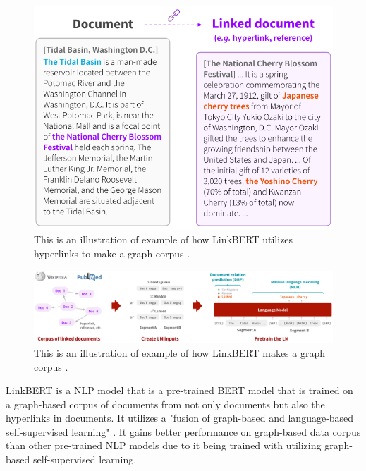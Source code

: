 \begin{figure}
    \includegraphics[width=1.0\columnwidth]{fig_motivation_v8.pdf}
    \caption{This is an illustration of example of how LinkBERT utilizes hyperlinks to make a graph corpus \cite{https://doi.org/10.48550/arxiv.2203.15827}.}
    \label{fig:LinkBERTGraphExample}
\end{figure}

\begin{figure}
    \includegraphics[width=1.0\columnwidth]{fig_overview_v13.pdf}
    \caption{This is an illustration of example of how LinkBERT makes a graph corpus \cite{https://doi.org/10.48550/arxiv.2203.15827}.}
    \label{fig:LinkBERTGraphIllustration}
\end{figure}

LinkBERT is a NLP model that is a pre-trained BERT \cite{https://doi.org/10.48550/arxiv.1810.04805} model that is trained on a graph-based corpus of documents from not only documents but also the hyperlinks in documents. It utilizes a "fusion of graph-based and language-based self-supervised learning" \cite{https://doi.org/10.48550/arxiv.2203.15827}. It gains better performance on graph-based data corpus than other pre-trained NLP models due to it being trained with utilizing graph-based self-supervised learning. 

